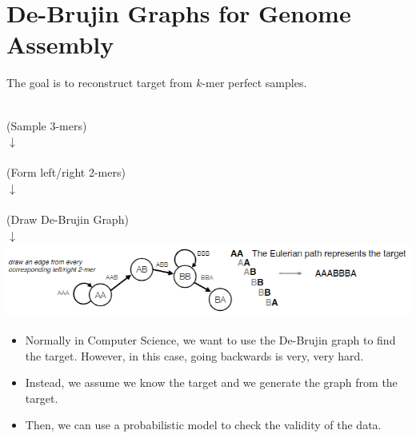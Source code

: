 \documentclass[10pt]{article}
\begin{document}
\section*{De-Brujin Graphs for Genome Assembly}
The goal is to reconstruct target from $k$-mer perfect samples.
\begin{center}
    \\
    \vspace{0.5cm}
    (Sample 3-mers)\\
    $\downarrow$\\
    \vspace{0.5cm}
    \\
    \vspace{0.5cm}
    (Form left/right 2-mers)\\
    $\downarrow$\\
    \vspace{0.5cm}
    \\
    \vspace{0.5cm}
    (Draw De-Brujin Graph)\\
    $\downarrow$\\
    \vspace{0.5cm}
    \includegraphics*[scale=0.9]{W4_7.png}
\end{center}
\begin{itemize}
    \item Normally in Computer Science, we want to use the De-Brujin graph to find the target.  However, in this case, going backwards is very, very hard.
    \item Instead, we assume we know the target and we generate the graph from the target.
    \item Then, we can use a probabilistic model to check the validity of the data.
\end{itemize}   
\end{document}
